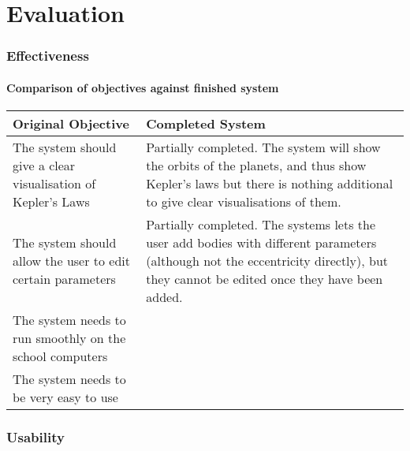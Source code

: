 \part{Evaluation}

%
%
%
%

\section{Effectiveness}
\subsection{Comparison of objectives against finished system}
\begin{tabular}{p{}p{}}
	Original Objective & Completed System \\\hline
	The system should give a clear visualisation of Kepler's Laws &
	Partially completed. The system will show the orbits of the planets, and
	thus show Kepler's laws but there is nothing additional to give clear
	visualisations of them.\\
	The system should allow the user to edit certain parameters & Partially
	completed. The systems lets the user add bodies with different
	parameters (although not the eccentricity directly), but they cannot be
	edited once they have been added. \\
	The system needs to run smoothly on the school computers & \\
	The system needs to be very easy to use & \\
\end{tabular}

\section{Usability}
%
